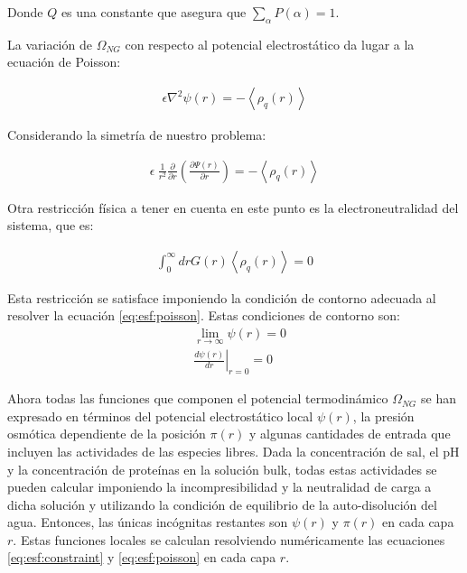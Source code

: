 \noindent Donde $Q$ es una constante que asegura que $\sum_\alpha P(\alpha) = 1$.


La variaci\'on de $\Omega_{NG}$ con respecto al potencial electrost\'atico da lugar a la ecuaci\'on de Poisson:

\begin{align}
	\epsilon\nabla^2\psi(r) = -\left<\rho_q(r)\right>
\end{align}

Considerando la simetr\'ia de nuestro problema:

\begin{align}
	\epsilon ~ \frac{1}{r^2} \frac{\partial}{\partial r}\left(\frac{\partial \Psi(r)}{\partial r}\right) = -\left<\rho_q(r)\right>
	\label{eq:esf:poisson}
\end{align}

Otra restricci\'on f\'isica a tener en cuenta en este punto es la electroneutralidad del sistema, que es:

\begin{align}
	\int_0^\infty{drG(r) \left<\rho_q(r)\right>} = 0
\end{align}

Esta restricci\'on se satisface imponiendo la condici\'on de contorno adecuada al resolver la ecuaci\'on \ref{eq:esf:poisson}. Estas condiciones de contorno son:
\begin{align}
	&  \lim_{r\to\infty}\psi(r) = 0 \\
	&  \left.\frac{d\psi(r)}{dr}\right|_{r=0} = 0
	\label{eq:esf:contorno}
	\end{align}
	

Ahora todas las funciones que componen el potencial termodin\'amico $\Omega_{NG}$ se han expresado en t\'erminos del potencial electrost\'atico local $\psi(r)$, la presi\'on osm\'otica dependiente de la posici\'on $\pi(r)$ y algunas cantidades de entrada que incluyen las actividades de las especies libres.
Dada la concentraci\'on de sal, el pH y la concentraci\'on de prote\'inas en la soluci\'on bulk, todas estas actividades se pueden calcular imponiendo la incompresibilidad y la neutralidad de carga a dicha soluci\'on y utilizando la condici\'on de equilibrio de la auto-disoluci\'on del agua.
Entonces, las \'unicas inc\'ognitas restantes son $\psi(r)$ y $\pi(r)$ en cada capa $r$.
Estas funciones locales se calculan resolviendo num\'ericamente las ecuaciones \ref{eq:esf:constraint} y \ref{eq:esf:poisson} en cada capa $r$.
 

